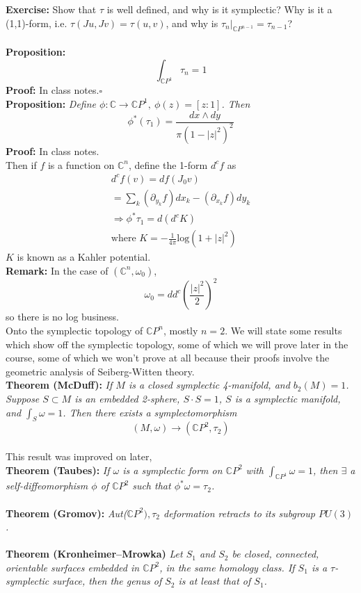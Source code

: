 \documentclass[12pt]{report}
\theoremstyle{definition}
\theoremstyle{remark}
\numberwithin{equation}{section}
\theoremstyle{definition}
\newcommand{\bb}[1]{\mathbb{#1}}
\newcommand{\mqed}{\hfill\newline\null \hfill$\square$\\ }
\begin{document}
\textbf{Exercise: }Show that $\tau$ is well defined, and why is it symplectic? Why is it a (1,1)-form, i.e. $\tau(Ju,Jv) = \tau(u,v)$, and why is $\tau_n|_{\bb CP^{n-1}} = \tau_{n-1}$? \\\\
\textbf{Proposition: }
$$
	\int_{\bb CP^1} \tau_n = 1
$$
\textbf{Proof: }In class notes.\mqed
\textbf{Proposition: }\textit{Define $\phi: \bb C \to \bb CP^1,\ \phi(z) = [z:1]$. Then }
$$
	\phi^*(\tau_1) = \frac{dx \wedge dy}{\pi(1-	|z|^2)^2}
$$
\textbf{Proof: }In class notes. \\
Then if $f$ is a function on $\bb C^n$, define the 1-form $d^c f$ as 
\begin{gather*}
	d^cf(v) = df(J_0v)\\
	= \sum_k (\partial_{y_k} f)dx_k - (\partial_{x_k} f) dy_k\\
	\Rightarrow \phi^* \tau_1 = d(d^cK)\\
	\text{where } K = -\frac{1}{4\pi} \text{log}(1+|z|^2)
\end{gather*}
$K$ is known as a Kahler potential. \\
\textbf{Remark: }In the case of $(\bb C^n,\omega_0)$,
$$
	\omega_0 = dd^c\left(\frac{|z|^2}{2}\right)^2
$$
so there is no log business. \\
Onto the symplectic topology of $\bb CP^n$, mostly $n = 2$. We will state some results which show off the symplectic topology, some of which we will prove later in the course, some of which we won't prove at all because their proofs involve the geometric analysis of Seiberg-Witten theory. \\
\textbf{Theorem (McDuff): }\textit{If $M$ is a closed symplectic 4-manifold, and $b_2(M) = 1$. Suppose $S \subset M$ is an embedded 2-sphere, $S \cdot S = 1$, $S$ is a symplectic manifold, and $\int_S \omega = 1$. Then there exists a symplectomorphism }
$$
	(M,\omega) \to (\bb CP^2, \tau_2)
$$\\
This result was improved on later,\\
\textbf{Theorem (Taubes): }\textit{If $\omega$ is a symplectic form on $\bb CP^2$ with $\int_{\bb CP^1} \omega = 1$, then $\exists$ a self-diffeomorphism $\phi$ of $\bb CP^2$ such that $\phi^* \omega = \tau_2$.}\\\\
\textbf{Theorem (Gromov): }\textit{Aut($\bb CP^2),\tau_2$ deformation retracts to its subgroup $PU(3)$. }\\\\
\textbf{Theorem (Kronheimer–Mrowka)} \textit{Let $S_1$ and $S_2$ be closed, connected, orientable surfaces embedded in $\bb CP^2$, in the same homology class. If $S_1$ is a $\tau$-symplectic surface, then the genus of $S_2$ is at least that of $S_1$. }\\
\end{document}
